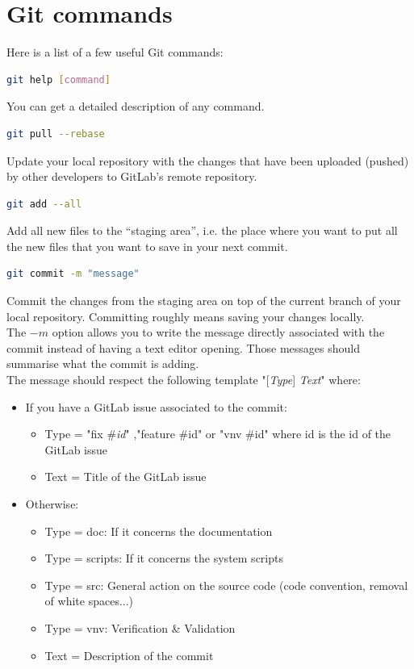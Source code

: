 \section{Git commands}
%
%
Here is a list of a few useful Git commands:
%
\begin{lstlisting}[language=bash]
git help [command]
\end{lstlisting}
You can get a detailed description of any command.
%
%
\begin{lstlisting}[language=bash]
git pull --rebase
\end{lstlisting}
Update your local repository with the changes that have been uploaded (pushed)
by other developers to GitLab's remote repository.
%
\begin{lstlisting}[language=bash]
git add --all
\end{lstlisting}
Add all new files to the ``staging area'', i.e. the place where you want to put
all the new files that you want to save in your next commit.
%
\begin{lstlisting}[language=bash]
git commit -m "message"
\end{lstlisting}
Commit the changes from the staging area on top of the current branch of your
local repository. Committing roughly means saving your changes locally.\\
The $-m$ option allows you to write the message
directly associated with the commit instead of having a text editor opening.
Those messages should summarise what the commit is adding.\\
The message should respect the following template "[\textit{Type}]
\textit{Text}" where:
\begin{itemize}
\item If you have a GitLab issue associated to the commit:
\begin{itemize}
\item Type = "fix \#\textit{id}" ,"feature \#id" or "vnv \#id" where id is the id of
the GitLab issue
\item Text = Title of the GitLab issue
\end{itemize}
\item Otherwise:
\begin{itemize}
\item Type = doc: If it concerns the documentation
\item Type = scripts: If it concerns the system scripts
\item Type = src: General action on the source code (code convention, removal
  of white spaces...)
\item Type = vnv: Verification \& Validation
\item Text = Description of the commit
\end{itemize}
\end{itemize}
